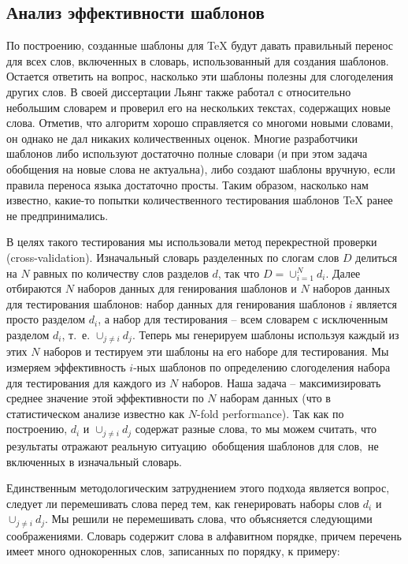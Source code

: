 \documentclass[12pt,a4paper,oneside]{extarticle}
\begin{document}
\subsection{Анализ эффективности шаблонов}

По построению, созданные шаблоны для \TeX{} будут давать правильный перенос для всех слов, включенных в словарь, использованный для создания шаблонов. Остается ответить на вопрос, насколько эти шаблоны полезны для слогоделения других слов. В своей диссертации Льянг также работал с относительно небольшим словарем и проверил его на нескольких текстах, содержащих новые слова. Отметив, что алгоритм хорошо справляется со многоми новыми словами, он однако не дал никаких количественных оценок. Многие разработчики шаблонов либо используют достаточно полные словари (и при этом задача обобщения на новые слова не актуальна), либо создают шаблоны вручную, если правила переноса языка достаточно просты. Таким образом, насколько нам известно, какие-то попытки количественного тестирования шаблонов \TeX{} ранее не предпринимались.

В целях такого тестирования мы использовали метод перекрестной проверки (\textenglish{cross-validation}). Изначальный словарь разделенных по слогам слов $D$ делиться на $N$ равных по количеству слов разделов $d$, так что $D = \cup_{i = 1}^{N} d_i$. Далее отбираются $N$ наборов данных для генирования шаблонов и $N$ наборов данных для тестирования шаблонов: набор данных для генирования шаблонов $i$ является просто разделом $d_i$, а набор для тестирования -- всем словарем с исключенным разделом $d_i$, т.~е. $\cup_{j \neq i} d_j$. Теперь мы генерируем шаблоны используя каждый из этих $N$ наборов и тестируем эти шаблоны на его наборе для тестирования. Мы измеряем эффективность  $i$-ных шаблонов по определению слогоделения набора для тестирования для каждого из $N$ наборов. Наша задача -- максимизировать среднее значение этой эффективности по $N$ наборам данных (что в статистическом анализе известно как \textenglish{$N$-fold performance}). Так как по построению, $d_i$ и $\cup_{j \neq i} d_j$ содержат разные слова, то мы можем считать, что результаты отражают реальную ситуацию обобщения шаблонов для слов, не включенных в изначальный словарь.

Единственным методологическим затруднением этого подхода является вопрос, следует ли перемешивать слова перед тем, как генерировать наборы слов $d_i$ и $\cup_{j \neq i} d_j$. Мы решили не перемешивать слова, что объясняется следующими соображениями. Словарь содержит слова в алфавитном порядке, причем перечень имеет много однокоренных слов, записанных по порядку, к примеру:
\end{document}
